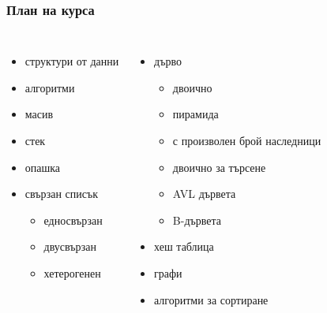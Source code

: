 \documentclass{beamer}
\begin{document}
\begin{frame}
  \frametitle{План на курса}

  \begin{columns}[t,onlytextwidth]

    \begin{itemize}
    \item структури от данни
    \item алгоритми
    \item масив
    \item стек
    \item опашка
    \item свързан списък
      \begin{itemize}
      \item едносвързан
      \item двусвързан
      \item хетерогенен
      \end{itemize}
    \end{itemize}


    \begin{itemize}
    \item дърво
      \begin{itemize}
      \item двоично
      \item пирамида
      \item с произволен брой наследници
      \item двоично за търсене
      \item AVL дървета
      \item B-дървета
      \end{itemize}
    \item хеш таблица
    \item графи
    \item алгоритми за сортиране
    \end{itemize}

  \end{columns}
\end{frame}
\end{document}
